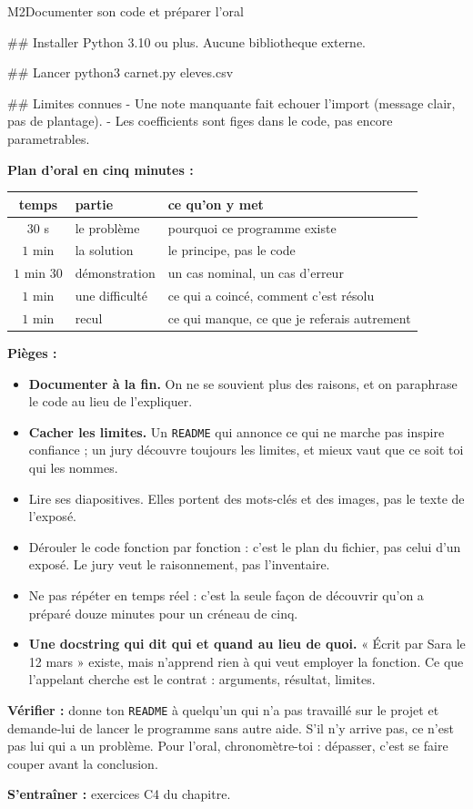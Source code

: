 \begin{fichemethode}{M2}{Documenter son code et préparer l'oral}
\begin{console}
## Installer
Python 3.10 ou plus. Aucune bibliotheque externe.

## Lancer
    python3 carnet.py eleves.csv

## Limites connues
- Une note manquante fait echouer l'import
  (message clair, pas de plantage).
- Les coefficients sont figes dans le code, pas encore parametrables.
\end{console}

\textbf{Plan d'oral en cinq minutes :}
\begin{center}
\begin{tabular}{c|l|l}
temps & partie & ce qu'on y met \\
\hline
$30$ s & le problème & pourquoi ce programme existe \\
$1$ min & la solution & le principe, pas le code \\
$1$ min $30$ & démonstration & un cas nominal, un cas d'erreur \\
$1$ min & une difficulté & ce qui a coincé, comment c'est résolu \\
$1$ min & recul & ce qui manque, ce que je referais autrement \\
\end{tabular}
\end{center}

\textbf{Pièges :}
\begin{itemize}
  \item \textbf{Documenter à la fin.} On ne se souvient plus des raisons, et on paraphrase le
    code au lieu de l'expliquer.
  \item \textbf{Cacher les limites.} Un \lstinline{README} qui annonce ce qui ne marche pas
    inspire confiance ; un jury découvre toujours les limites, et mieux vaut que ce soit toi
    qui les nommes.
  \item Lire ses diapositives. Elles portent des mots-clés et des images, pas le texte de
    l'exposé.
  \item Dérouler le code fonction par fonction : c'est le plan du fichier, pas celui d'un
    exposé. Le jury veut le raisonnement, pas l'inventaire.
  \item Ne pas répéter en temps réel : c'est la seule façon de découvrir qu'on a préparé
    douze minutes pour un créneau de cinq.
  \item \textbf{Une docstring qui dit qui et quand au lieu de quoi.} « Écrit par Sara le
    12 mars » existe, mais n'apprend rien à qui veut employer la fonction. Ce que l'appelant
    cherche est le contrat : arguments, résultat, limites.
\end{itemize}

\textbf{Vérifier :} donne ton \lstinline{README} à quelqu'un qui n'a pas travaillé sur le
projet et demande-lui de lancer le programme sans autre aide. S'il n'y arrive pas, ce n'est
pas lui qui a un problème. Pour l'oral, chronomètre-toi : dépasser, c'est se faire couper
avant la conclusion.

\textbf{S'entraîner :} exercices C4 du chapitre.
\end{fichemethode}
